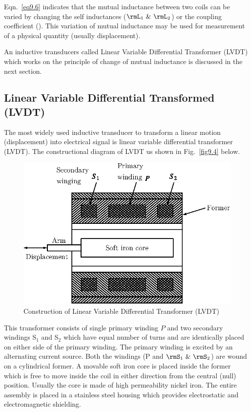 \vfill\eject

Eqn.~\eqref{eq9.6} indicates that the mutual inductance between two
coils can be varied by changing the self inductances
($\rmL_1 ~\&~ \rmL_2$) or the coupling coefficient (\rmM). This
variation of mutual inductance may be used for measurement of a
physical quantity (usually displacement).

An inductive transducers called Linear Variable Differential
Transformer (LVDT) which works on the principle of change of mutual
inductance is discussed in the next section.

\subsection{Linear Variable Differential Transformed (LVDT)}\label{sec9.6.3}

The most widely used inductive transducer to transform a linear motion
(displacement) into electrical signal is linear variable differential
transformer (LVDT). The constructional diagram of LVDT us shown in
Fig.~\ref{fig9.4} below.
\begin{figure}[H]
\centering
\includegraphics[scale=1.15]{chap9/fig9.3a.eps}

\medskip
\caption{Construction of Linear Variable Differential Transformer (LVDT)}\label{fig9.5}
\end{figure}

This transformer consists of single primary winding $P$ and two
secondary windings S$_1$ and S$_2$ which have equal number of turns
and are identically placed on either side of the primary winding. The
primary winding is excited by an alternating current source. Both the
windings (P and $\rmS_1 ~\&~ \rmS_2$) are wound on a cylindrical former. A
movable soft iron core is placed inside the former which is free to
move inside the coil in either direction from the central (null)
position. Usually the core is made of high permeability nickel
iron. The entire assembly is placed in a stainless steel housing which
provides electrostatic and electromagnetic shielding.

